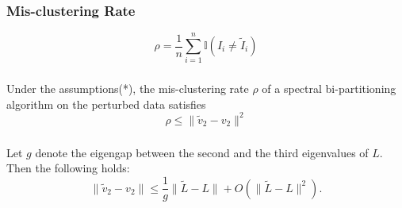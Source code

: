\documentclass{beamer}
\begin{document}
\begin{frame}
\frametitle{Mis-clustering Rate}

\begin{equation}
  \label{eq:misClust}
  \rho = \frac{1}{n} \sum_{i = 1}^{n} \mathbb{I}(I_i \neq \tilde{I}_i)
\end{equation}


\end{frame}


\begin{frame}
\frametitle{}

\begin{Theorem}
Under the assumptions(*), the mis-clustering rate $\rho$ of a spectral bi-partitioning algorithm on the perturbed data satisfies
  \begin{equation}
    \label{eq:rho1}
    \rho \leq \| \tilde{v}_2 - v_2 \|^2
  \end{equation}
\end{Theorem}


\end{frame}

\begin{frame}
\frametitle{}

\begin{lemma}
Let $g$ denote the eigengap between the second and the third eigenvalues of $L$. Then the following holds:
\begin{equation}
  \label{eq:eigengap}
  \| \tilde{v}_2-v_2 \| \leq \frac{1}{g} \| \tilde{L} - L \| + O(\| \tilde{L} - L \|^2).
\end{equation}
\end{lemma}
\end{frame}
\end{document}
